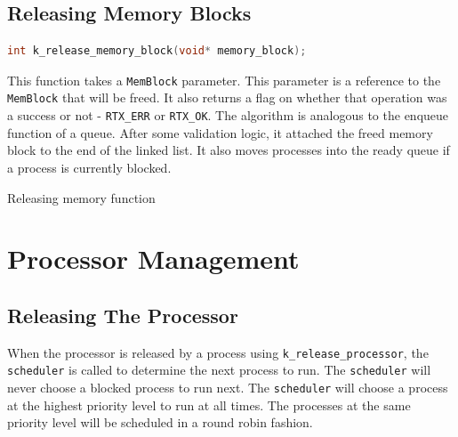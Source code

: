 \documentclass[12pt]{report}
\begin{document}
\subsection{Releasing Memory Blocks}

\begin{minipage}{\textwidth}
\begin{lstlisting}[language=C, frame=single]
int k_release_memory_block(void* memory_block);
\end{lstlisting}
\end{minipage}

This function takes a \texttt{MemBlock} parameter. This parameter is a reference to the \texttt{MemBlock} that will be freed. It also returns a flag on whether that operation was a success or not - \texttt{RTX_ERR} or \texttt{RTX_OK}. The algorithm is analogous to the enqueue function of a queue. After some validation logic, it attached the freed memory block to the end of the linked list. It also moves processes into the ready queue if a process is currently blocked.

\begin{algorithm}[H]
  \caption{Releasing memory function}
  \begin{algorithmic}[1]
	  \EndIf
	  \EndIf
	  \EndIf
	  \EndIf
    \EndProcedure
  \end{algorithmic}
\end{algorithm}

\pagebreak



\section{Processor Management}

\subsection{Releasing The Processor}
When the processor is released by a process using \texttt{k_release_processor}, the \texttt{scheduler} is called to determine the next process to run. The \texttt{scheduler} will never choose a blocked process to run next.  The \texttt{scheduler} will choose a process at the highest priority level to run at all times.  The processes at the same priority level will be scheduled in a round robin fashion.
\end{document}
